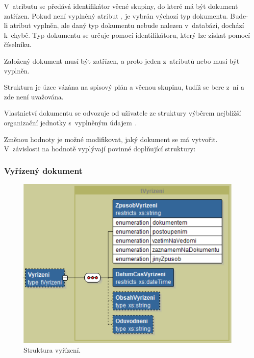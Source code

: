 \documentclass[
  master,
  field=ainfp,
  biblatex,
  language=czech,
  glossaries,
  theorems=false,
  index
]{kidiplom}
\begin{document}
V~atributu  se předává identifikátor věcné skupiny, do které má být dokument zatřízen. Pokud není vyplněný atribut , je vybrán výchozí typ dokumentu. Bude-li atribut vyplněn, ale daný typ dokumentu nebude nalezen v~databázi, dochází k~chybě. Typ dokumentu se určuje pomocí identifikátoru, který lze získat pomocí číselníku.

Založený dokument musí být zatřízen, a proto jeden z~atributů  nebo  musí být vyplněn.

Struktura  je úzce vázána na spisový plán a věcnou skupinu, tudíž se bere z~ní a zde není uvažována.

Vlastnictví dokumentu se odvozuje od uživatele ze struktury  výběrem nejbližší organizační jednotky s~vyplněným údajem .

Změnou hodnoty  je možné modifikovat, jaký dokument se má vytvořit. V~závislosti na hodnotě vyplývají povinné doplňující struktury:

\subsubsection{Vyřízený dokument}      
\begin{figure}[h]
  \centerline{\includegraphics[width=0.9\linewidth]{./images/Vyrizeni.png}} 
  \caption{Struktura vyřízení.} 
\end{figure}         
               
\end{document}
